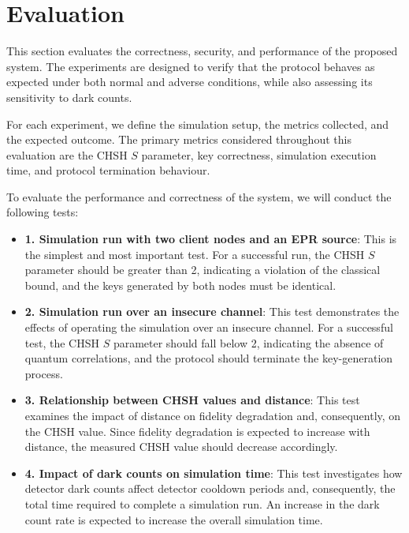 \section{Evaluation}\label{s:evaluation}

This section evaluates the correctness, security, and performance of the proposed system. The experiments are designed to verify that the protocol behaves as expected under both normal and adverse conditions, while also assessing its sensitivity to dark counts.

For each experiment, we define the simulation setup, the metrics collected, and the expected outcome. The primary metrics considered throughout this evaluation are the CHSH \(S\) parameter, key correctness, simulation execution time, and protocol termination behaviour. 

To evaluate the performance and correctness of the system, we will conduct the following tests:

\begin{itemize}
  \item \textbf{1. Simulation run with two client nodes and an EPR source}: This is the simplest and most important test. For a successful run, the CHSH \(S\) parameter should be greater than 2, indicating a violation of the classical bound, and the keys generated by both nodes must be identical.

  \item \textbf{2. Simulation run over an insecure channel}: This test demonstrates the effects of operating the simulation over an insecure channel. For a successful test, the CHSH \(S\) parameter should fall below 2, indicating the absence of quantum correlations, and the protocol should terminate the key-generation process.

  \item \textbf{3. Relationship between CHSH values and distance}: This test examines the impact of distance on fidelity degradation and, consequently, on the CHSH value. Since fidelity degradation is expected to increase with distance, the measured CHSH value should decrease accordingly.

  \item \textbf{4. Impact of dark counts on simulation time}: This test investigates how detector dark counts affect detector cooldown periods and, consequently, the total time required to complete a simulation run. An increase in the dark count rate is expected to increase the overall simulation time.
\end{itemize}

